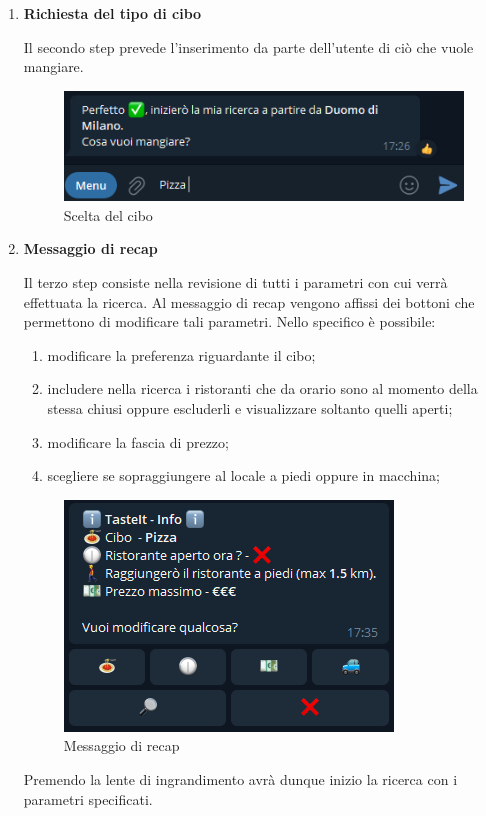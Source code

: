 \documentclass[a4paper, 12pt]{article}
\begin{document}
\begin{enumerate}
		\item \textbf{Richiesta del tipo di cibo}
		
		Il secondo step prevede l'inserimento da parte dell'utente di ciò che vuole mangiare.
		\begin{figure}[!htb]
			\centering
			\includegraphics[scale=0.9]{cercaCommand_foodChoice.png}
			\caption{Scelta del cibo}
		\end{figure}
	
		\item \textbf{Messaggio di recap}
		
		Il terzo step consiste nella revisione di tutti i parametri con cui verrà effettuata la ricerca.
		Al messaggio di recap vengono affissi dei bottoni che permettono di modificare tali parametri. Nello specifico è possibile:
		\begin{enumerate}
			\item modificare la preferenza riguardante il cibo;
			\item includere nella ricerca i ristoranti che da orario sono al momento della stessa chiusi oppure escluderli e visualizzare soltanto quelli aperti;
			\item modificare la fascia di prezzo;
			\item scegliere se sopraggiungere al locale a piedi oppure in macchina;
		\end{enumerate}
		\begin{figure}[!htb]
			\centering
			\includegraphics[scale=0.9]{cercaCommand_recapMsg.png}
			\caption{Messaggio di recap}
		\end{figure}
		Premendo la lente di ingrandimento avrà dunque inizio la ricerca con i parametri specificati.
		

\end{enumerate}
\end{document}
